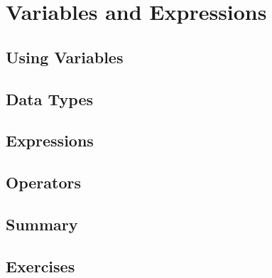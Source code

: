 \chapter{Variables and Expressions}


\section{Using Variables}



\section{Data Types}


\section{Expressions}



\section{Operators}






\section{Summary}


\section{Exercises}


